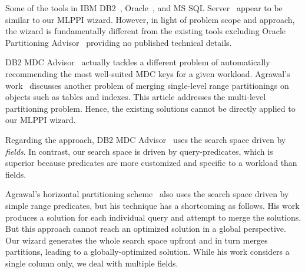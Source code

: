 \documentclass[runningheads]{comsis2}
\begin{document}
%

Some of the tools in IBM DB2~\cite{Lightstone04:db2auto}, 
Oracle~\cite{sheet2009oracle}, and MS SQL Server~\cite{agrawal04:integrating} 
appear to be similar to our MLPPI wizard. 
However, in light of problem scope and approach, the wizard 
is fundamentally different from the existing tools excluding Oracle Partitioning \hbox{Advisor}~\cite{sheet2009oracle} 
providing no published technical details. 

DB2 MDC Advisor~\cite{Lightstone04:db2auto} actually tackles 
a different problem of automatically recommending the most well-suited MDC 
keys for a given workload. 
Agrawal's work~\cite{agrawal04:integrating} 
discusses another problem of merging \hbox{single-level} range partitionings on objects such as tables and indexes. 
This article addresses the multi-level \hbox{partitioning} problem. 
Hence, the existing solutions cannot be directly applied to our MLPPI wizard.   

Regarding the approach, DB2 MDC Advisor~\cite{Lightstone04:db2auto} uses 
the search space driven by {\em fields}. In contrast, our search 
space is driven by query-predicates, which is superior because 
predicates are more customized and specific to a workload than fields. 

Agrawal's horizontal partitioning scheme~\cite{agrawal04:integrating} 
also uses the search space driven by simple range predicates, but 
his technique has a shortcoming as follows. 
His work produces a solution for each individual query and attempt 
to merge the solutions. But this approach cannot reach 
an optimized solution in a global perspective.
Our wizard generates the whole search space upfront and in turn merges partitions, leading to a \hbox{globally-optimized} solution. 
While his work considers a single column only, we deal with multiple fields.
\end{document}
